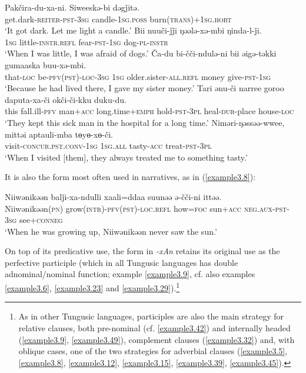 \documentclass[output=paper,colorlinks,citecolor=brown]{langscibook}
\begin{document}
\ea
\label{example3.3}
\gll Pakčira-du-xa-ni.			Siweeskə-bi		dəgǰitə.\\
     get.dark-\textsc{reiter}-\textsc{pst}-\textsc{3sg}
     candle-\textsc{1sg.poss}
     burn(\textsc{trans})+\textsc{1sg.hort}\\
\glt `It got dark. Let me light a candle.’
\ex
\label{example3.4}
\gll Bii		nuuči-ǰǰi			ŋəələ-xə-mbi		ŋinda-l-ǰi.\\
     \textsc{1sg}		little-\textsc{instr.refl}	fear-\textsc{pst}-\textsc{1sg}		dog-\textsc{pl}-\textsc{instr}\\
\glt `When I was little, I was afraid of dogs.’
\ex
\label{example3.5}
\gll Ča-du	bi-čči-ndulə-ni	bii	əigə-təkki			gumaaska	buu-xə-mbi.\\
     that-\textsc{loc}	be-\textsc{pfv(pst)}-\textsc{loc}-\textsc{3sg}	\textsc{1sg}	older.sister-\textsc{all.refl}	money		give-\textsc{pst}-\textsc{1sg}\\
\glt `Because he had lived there, I gave my sister money.’
\ex
\label{example3.6}
\gll Tari	ənu-či		narree		goroo			daputa-xa-či	okči-či-kku		duku-du.\\
     this	fall.ill-\textsc{pfv}	man+\textsc{acc}	long.time+\textsc{emph}	hold-\textsc{pst}-\textsc{3pl}	heal-\textsc{dur}-place	house-\textsc{loc}\\
\glt `They kept this sick man in the hospital for a long time.’
\ex
\label{example3.7}
\gll Niməri-ŋəssəə-wwee,			mittəi	aptauli-mba	tɵyɵ-xɵ-či.\\
     visit-\textsc{concur}.\textsc{pst}.\textsc{conv}-\textsc{1sg}	\textsc{1sg}.\textsc{all}	tasty-\textsc{acc}	treat-\textsc{pst}-\textsc{3pl}\\
\glt `When I visited [them], they always treated me to something tasty.’
\z

It is also the form most often used in narratives, as in (\ref{example3.8}):

\ea
\label{example3.8}
\gll Niiwənikəən		balǰi-xa-ndulli			xaali=ddaa	suunəə		ə-čči-ni ittəə.\\
     Niiwənikəən(\textsc{pn})	grow(\textsc{intr})-\textsc{pfv(pst)}-\textsc{loc}.\textsc{refl}	how=\textsc{foc}	sun+\textsc{acc}		\textsc{neg.aux}-\textsc{pst}-\textsc{3sg}
	see+\textsc{conneg}\\
\glt `When he was growing up, Niiwənikəən never saw the sun.’
\z

On top of its predicative use, the form in \textit{-xAn} retains its original use as the perfective participle (which in all Tungusic languages has double adnominal/nominal function; example \ref{example3.9}, cf. also examples \ref{example3.6}, \ref{example3.23} and \ref{example3.29}).\footnote{As in other Tungusic languages, participles are also the main strategy for relative clauses, both pre-nominal (cf. \ref{example3.42}) and internally headed (\ref{example3.9}, \ref{example3.49}), complement clauses (\ref{example3.32}) and, with oblique cases, one of the two strategies for adverbial clauses (\ref{example3.5}, \ref{example3.8}, \ref{example3.12}, \ref{example3.15}, \ref{example3.39}, \ref{example3.45}).}
\end{document}

